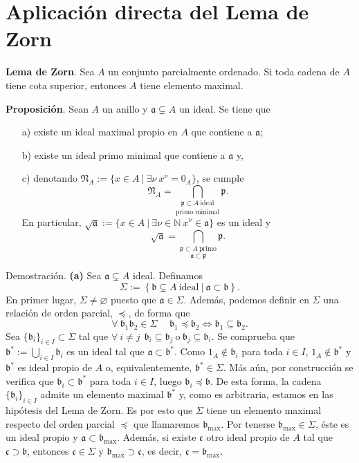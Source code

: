 \documentclass[a4paper,12pt]{article}
\newcommand{\N}{\mathbb{N}}
\newcommand{\p}{\mathfrak{p}}
\newcommand{\af}{\mathfrak{a}}
\newcommand{\bfr}{\mathfrak{b}}
\newcommand{\cf}{\mathfrak{c}}
\newcommand{\Nf}{\mathfrak{N}}
\begin{document}
\section{Aplicación directa del Lema de Zorn}
\textbf{Lema de Zorn}. Sea $A$ un conjunto parcialmente ordenado. Si toda cadena de $A$ tiene cota superior, entonces $A$ tiene elemento maximal.

\textbf{Proposición}. Sean $A$ un anillo y $\af\subsetneq A$ un ideal. Se tiene que\begin{itemize}
    \item[a)] existe un ideal maximal propio en $A$ que contiene a $\af$;
    \item[b)] existe un ideal primo minimal que contiene a $\af$ y,
    \item[c)] denotando $\Nf_A:=\{x\in A\ |\ \exists\nu\ x^{\nu}=0_A\}$, se cumple$$\Nf_A=\underset{\text{primo minimal}}{\bigcap_{\p\subset A\ \text{ideal}}}\p.$$En particular, $\sqrt{\af}:=\{x\in A\ |\ \exists\nu\in\N\ x^\nu\in\af\}$ es un ideal y$$\sqrt{\af}=\underset{\af\subset\p}{\bigcap_{\p\subset A\ \text{primo}}}\p.$$
\end{itemize}
Demostración. \textbf{(a)} Sea $\af\subsetneq A$ ideal. Definamos$$\Sigma:=\left\{\bfr\subsetneq A\ \text{ideal}\ |\ \af\subset\bfr \right\}.$$
En primer lugar, $\Sigma\neq\varnothing$ puesto que $\af\in\Sigma$. Además, podemos definir en $\Sigma$ una relación de orden parcial, $\preceq$, de forma que$$\forall\ \bfr_1\bfr_2\in\Sigma\hspace{15pt}\bfr_1\preceq\bfr_2\Leftrightarrow\bfr_1\subseteq\bfr_2.$$
Sea $\{\bfr_i\}_{i\in I}\subset\Sigma$ tal que $\forall\ i\neq j\hspace{5pt}\bfr_i\subseteq\bfr_j\ \text{o}\ \bfr_j\subseteq\bfr_i$. Se comprueba que $\bfr^*:=\bigcup_{i\in I}\bfr_i$ es un ideal tal que $\af\subset\bfr^*$. 
Como $1_A\notin\bfr_i$ para toda $i\in I$, $1_A\notin\bfr^*$ y $\bfr^*$ es ideal propio de $A$ o, equivalentemente, $\bfr^*\in\Sigma$. Más aún, por construcción se verifica que $\bfr_i\subset\bfr^*$ para toda $i\in I$, luego $\bfr_i\preceq\bfr$. 
De esta forma, la cadena $\{\bfr_i\}_{i\in I}$ admite un elemento maximal $\bfr^*$ y, como es arbitraria, estamos en las hipótesis del Lema de Zorn. 
Es por esto que $\Sigma$ tiene un elemento maximal respecto del orden parcial $\preceq$ que llamaremos $\bfr_{\max}$.
Por tenerse $\bfr_{\max}\in\Sigma$, éste es un ideal propio y $\af\subset\bfr_{\max}$. Además, si existe $\cf$ otro ideal propio de $A$ tal que $\cf\supset\bfr$, entonces $\cf\in\Sigma$ y $\bfr_{\max}\supset\cf$, es decir, $\cf=\bfr_{\max}$.
\end{document}
